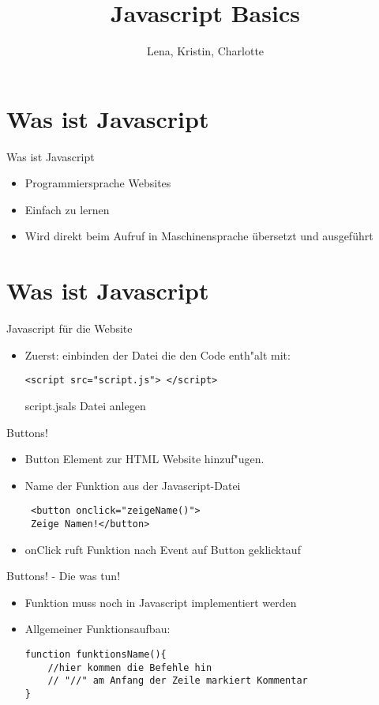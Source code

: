 \documentclass[18pt]{beamer}
\title[Javascript Basics]{Javascript Basics}
\author{Lena, Kristin, Charlotte}
\begin{document}

\begin{frame}
\titlepage
\end{frame}

\section {Was ist Javascript}
\begin{frame}{Was ist Javascript}
\begin {itemize}
\item Programmiersprache Websites
\item Einfach zu lernen 
\item Wird direkt beim Aufruf in Maschinensprache übersetzt und ausgeführt
\end {itemize}
\end{frame}

\section {Was ist Javascript}
\begin{frame}[fragile]{Javascript für die Website}
\begin {itemize}
\item Zuerst:  einbinden der Datei die den Code enth"alt mit:
\begin{lstlisting}
<script src="script.js"> </script>
\end{lstlisting}
\glqq script.js\grqq als Datei anlegen
\end {itemize}
\end{frame}


\begin{frame}[fragile]{Buttons!}
\begin {itemize}
\item Button Element zur HTML Website hinzuf"ugen. 
\item Name der Funktion aus der Javascript-Datei
\begin{lstlisting}
 <button onclick="zeigeName()">
 Zeige Namen!</button>
\end{lstlisting}
\item onClick ruft Funktion nach Event \glqq auf Button geklickt\grqq auf
\end {itemize}
\end{frame}

\begin{frame}[fragile]{Buttons! - Die was tun!}
\begin {itemize}
\item Funktion muss noch in Javascript implementiert werden
\item Allgemeiner Funktionsaufbau:
\begin{lstlisting}
function funktionsName(){
	//hier kommen die Befehle hin
	// "//" am Anfang der Zeile markiert Kommentar
}
\end{lstlisting}
\end {itemize}
\end{frame}
\end{document}
